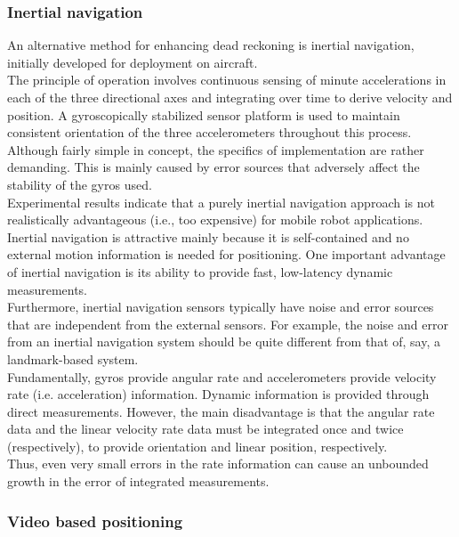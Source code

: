 \subsubsection{Inertial navigation}
\label{sec:mobile:inertial}

An alternative method for enhancing dead reckoning is
inertial navigation, initially developed for deployment on
aircraft.
\\
The principle of operation involves continuous sensing of minute
accelerations in each of the three directional axes and integrating over time
to derive velocity and position. A gyroscopically stabilized
sensor platform is used to maintain consistent orientation of the three
accelerometers throughout this process.
\\
Although fairly simple in concept, the specifics of implementation are
rather demanding. This is mainly caused by error sources that adversely
affect the stability of the gyros used.
\\
Experimental results indicate that a purely inertial navigation approach
is not realistically advantageous (i.e., too expensive) for mobile robot
applications.
\\
Inertial navigation is attractive mainly because it is self-contained
and no external motion information is needed for positioning. One important
advantage of inertial navigation is its ability to provide fast, low-latency
dynamic measurements.
\\
Furthermore, inertial navigation sensors typically have noise and error sources
that are independent from the external sensors. For example, the noise and error
from an inertial navigation system should be quite different
from that of, say, a landmark-based system.
\\
Fundamentally, gyros provide angular rate and accelerometers provide
velocity rate (i.e. acceleration) information. Dynamic information is
provided through direct
measurements. However, the main disadvantage is that the angular rate data
and the linear velocity rate data must be integrated once and twice (respectively),
to provide orientation and linear position, respectively.
\\
Thus, even very small errors in the rate information can cause an unbounded
growth in the error of integrated measurements.

\subsubsection{Video based positioning}
\label{sec:mobile:video}

